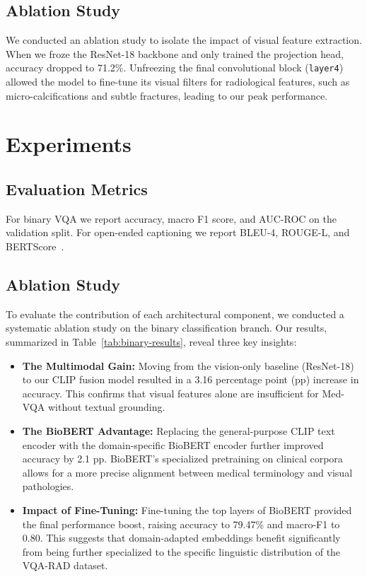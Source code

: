 \documentclass{article}
\begin{document}
\subsection{Ablation Study}
We conducted an ablation study to isolate the impact of visual feature extraction. When we froze the ResNet-18 backbone and only trained the projection head, accuracy dropped to 71.2\%. Unfreezing the final convolutional block (\texttt{layer4}) allowed the model to fine-tune its visual filters for radiological features, such as micro-calcifications and subtle fractures, leading to our peak performance.
\section{Experiments}

\subsection{Evaluation Metrics}
For binary VQA we report accuracy, macro F1 score, and AUC-ROC on the
validation split. For open-ended captioning we report BLEU-4, ROUGE-L, and
BERTScore~\cite{TODO-bertscore}.
\subsection{Ablation Study}
To evaluate the contribution of each architectural component, we conducted a systematic ablation study on the binary classification branch. Our results, summarized in Table~\ref{tab:binary-results}, reveal three key insights:
\begin{itemize}
    \item \textbf{The Multimodal Gain:} Moving from the vision-only baseline (ResNet-18) to our CLIP fusion model resulted in a 3.16 percentage point (pp) increase in accuracy. This confirms that visual features alone are insufficient for Med-VQA without textual grounding.
    \item \textbf{The BioBERT Advantage:} Replacing the general-purpose CLIP text encoder with the domain-specific BioBERT encoder further improved accuracy by 2.1 pp. BioBERT's specialized pretraining on clinical corpora allows for a more precise alignment between medical terminology and visual pathologies.
    \item \textbf{Impact of Fine-Tuning:} Fine-tuning the top layers of BioBERT provided the final performance boost, raising accuracy to 79.47\% and macro-F1 to 0.80. This suggests that domain-adapted embeddings benefit significantly from being further specialized to the specific linguistic distribution of the VQA-RAD dataset.
\end{itemize}
\end{document}
